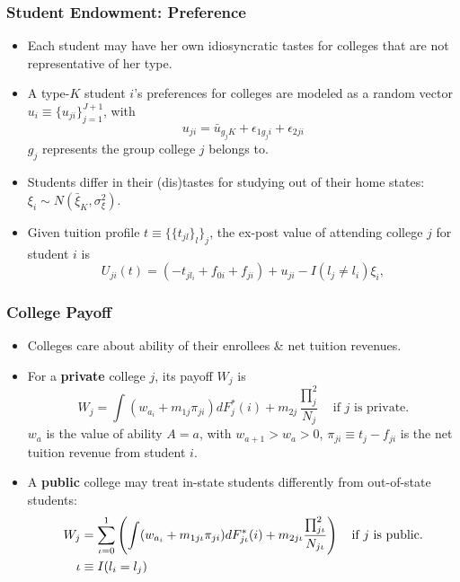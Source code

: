 \documentclass[10pt]{beamer}
\begin{document}
\begin{frame}[c]\frametitle{Student Endowment: Preference}

\begin{itemize}
    \item Each student may have her own idiosyncratic tastes for colleges that are not representative of her type.
    \item A type-$K$ student $i$'s preferences for colleges are modeled as a random vector $u_{i} \equiv \{u_{ji}\}_{j=1}^{J+1}$, with
    \begin{equation*}
        u_{ji} = \bar{u}_{g_{j}K} + \epsilon_{1g_{j}i} + \epsilon_{2ji}
    \end{equation*}
$g_{j}$ represents the group college $j$ belongs to.
    \item  Students differ in their (dis)tastes for studying out of their home states: $\xi_{i}\sim N(\bar{\xi}_{K},\sigma^{2}_{\xi})$.
    \item  Given tuition profile $t\equiv \{\{t_{jl}\}_{l}\}_{j}$, the ex-post value of attending college $j$ for student $i$ is
    \begin{equation}
        U_{ji}(t) = (-t_{jl_{i}} + f_{0i} + f_{ji}) + u_{ji} - I(l_{j}\not = l_{i}) \xi_{i},
    \end{equation}
\end{itemize}

\end{frame}

\begin{frame}[c]\frametitle{College Payoff}
\begin{itemize}
    \item Colleges care about ability of their enrollees \& net tuition revenues.
    \item For a \textbf{\alert{private}} college $j$, its payoff $W_{j}$ is
    \begin{equation}
        W_{j} = \int(w_{a_{i}}+m_{1j}\pi_{ji})d F_{j}^{*}(i) + m_{2j} \frac{\prod_{j}^{2}}{N_{j}} \quad \text{if $j$ is private}.
    \end{equation}
$w_{a}$ is the value of ability $A=a$, with $w_{a+1}>w_{a}>0$, $\pi_{ji} \equiv t_{j}-f_{ji}$ is the net tuition revenue from student $i$.
    \item A \textbf{\alert{public}} college may treat in-state students differently from out-of-state students:
    \begin{align}
        W_{j} & = \sum_{\iota=0}^{1}\left(\int(w_{a_{i}}+m_{1j\iota}\pi_{ji})d F_{j\iota}^{*}(i) + m_{2j\iota} \frac{\prod_{j\iota}^{2}}{N_{j\iota}} \right) \quad \text{if $j$ is public}.\\
        \iota & \equiv I(l_{i}=l_{j}) \notag
    \end{align}

\end{itemize}

\end{frame}
\end{document}
